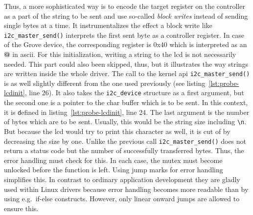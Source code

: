 Thus, a more sophisticated way is to encode the target register on the controller as a part of the string to be sent and use so-called \textit{block writes} instead of sending single bytes at a time.
It instrumentalizes the effect a block write like \texttt{i2c_master_send()} interprets the first sent byte as a controller register.
In case of the Grove device, the corresponding register is 0x40 which is interpreted as an \textbf{@} in \ac{ascii}.
For this initialization, writing a string to the \ac{lcd} is not necessarily needed.
This part could also been skipped, thus, but it illustrates the way strings are written inside the whole driver.
The call to the kernel \ac{api} \texttt{i2c_master_send()} is as well slightly different from the one used previously (see listing~\ref{lst:probe-lcdinit}, line 26).
It also takes the \texttt{i2c\_device} structure as a first argument, but the second one is a pointer to the char buffer which is to be sent.
In this context, it is \texttt defined in listing~\ref{lst:probe-lcdinit}, line 24.
The last argument is the number of bytes which are to be sent. 
Usually, this would be the string size including \texttt{\textbackslash n}.
But because the \ac{lcd} would try to print this character as well, it is cut of by decreasing the size by one.
Unlike the previous call \texttt{i2c_master_send()} does not return a status code but the number of successfully transferred bytes.
Thus, the error handling must check for this.
In each case, the mutex must become unlocked before the function is left.
Using jump marks for error handling simplifies this.
In contrast to ordinary application development they are gladly used within Linux drivers because error handling becomes more readable than by using e.g.\ if-else constructs.
However, only linear onward jumps are allowed to ensure this.

